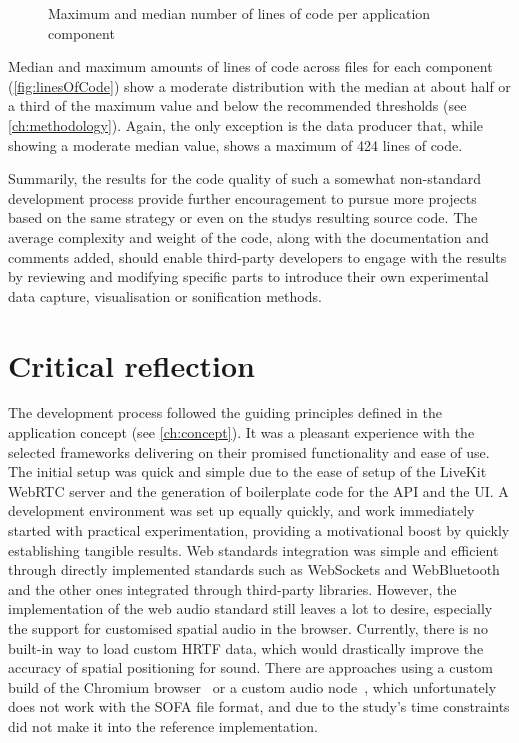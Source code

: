 \begin{figure}[h]
\centering

\caption[Lines of code]{Maximum and median number of lines of code per application component\protect}
\label{fig:linesOfCode}
\end{figure}

Median and maximum amounts of lines of code across files for each component (\autoref{fig:linesOfCode}) show a moderate distribution with the median at about half or a third of the maximum value and below the recommended thresholds (see \autoref{ch:methodology}).
Again, the only exception is the data producer that, while showing a moderate median value, shows a maximum of 424 lines of code.

Summarily, the results for the code quality of such a somewhat non-standard development process provide further encouragement to pursue more projects based on the same strategy or even on the study\textquotesingle s resulting source code.
The average complexity and weight of the code, along with the documentation and comments added, should enable third-party developers to engage with the results by reviewing and modifying specific parts to introduce their own experimental data capture, visualisation or sonification methods.

\section{Critical reflection}
\label{sec:critical-reflection}

The development process followed the guiding principles defined in the application concept (see \autoref{ch:concept}).
It was a pleasant experience with the selected frameworks delivering on their promised functionality and ease of use.
The initial setup was quick and simple due to the ease of setup of the LiveKit \ac{WebRTC} server and the generation of boilerplate code for the \ac{API} and the \ac{UI}.
A development environment was set up equally quickly, and work immediately started with practical experimentation, providing a motivational boost by quickly establishing tangible results.
Web standards integration was simple and efficient through directly implemented standards such as WebSockets and WebBluetooth and the other ones integrated through third-party libraries.
However, the implementation of the web audio standard still leaves a lot to desire, especially the support for customised spatial audio in the browser.
Currently, there is no built-in way to load custom \ac{HRTF} data, which would drastically improve the accuracy of spatial positioning for sound.
There are approaches using a custom build of the Chromium browser~\parencite{chromiumCustomHrtf} or a custom audio node~\parencite{customHrtfAudioNode}, which unfortunately does not work with the \ac{SOFA} file format, and due to the study's time constraints did not make it into the reference implementation.


